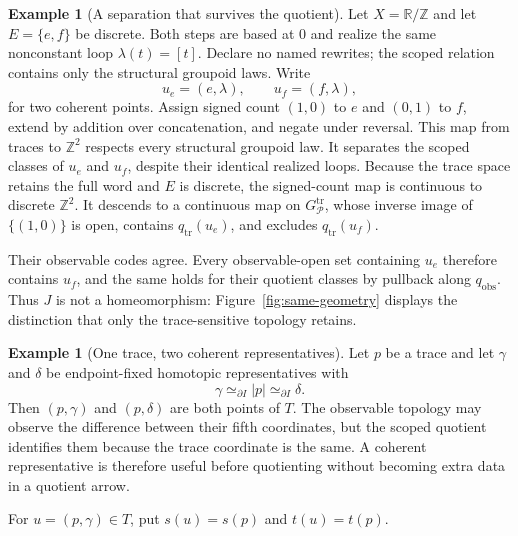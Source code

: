\documentclass[10pt,reqno]{amsart}
\theoremstyle{definition}
\newtheorem{example}[definition]{Example}
\theoremstyle{plain}
\theoremstyle{remark}
\newcommand{\FigureAltText}[1]{\par\smallskip{\small\textbf{Alt text:} #1\par}}
\newcommand{\MainFigure}[2]{%
  \begingroup\let\SavedFigureCaption\caption
  \renewcommand{\caption}[1]{\SavedFigureCaption{##1}\FigureAltText{#2}}%
  \endgroup}
\begin{document}
\begin{example}[A separation that survives the quotient]
\label{ex:quotient-topology-separation}
Let $X=\mathbb R/\mathbb Z$ and let $E=\{e,f\}$ be discrete.
Both steps are based at $0$ and realize the same nonconstant loop
$\lambda(t)=[t]$.  Declare no named rewrites; the scoped relation contains
only the structural groupoid laws.  Write
\[
  u_e=(e,\lambda),\qquad u_f=(f,\lambda),
\]
for two coherent points.  Assign signed count $(1,0)$ to $e$ and $(0,1)$
to $f$, extend by addition over concatenation, and negate under reversal.
This map from traces to $\mathbb Z^2$ respects every structural groupoid
law.  It separates the scoped classes of $u_e$ and $u_f$, despite their
identical realized loops.  Because the trace space retains the full word
and $E$ is discrete, the signed-count map is continuous to discrete
$\mathbb Z^2$.  It descends to a continuous map on
$G_{\mathcal P}^{\mathrm{tr}}$, whose inverse image of $\{(1,0)\}$ is open,
contains $q_{\mathrm{tr}}(u_e)$, and excludes $q_{\mathrm{tr}}(u_f)$.

Their observable codes agree. Every observable-open set containing $u_e$
therefore contains $u_f$, and the same holds for their quotient classes by
pullback along $q_{\mathrm{obs}}$. Thus $J$ is not a homeomorphism:
Figure~\ref{fig:same-geometry} displays the distinction that only the
trace-sensitive topology retains.

\end{example}

\MainFigure{same-geometry}{Two distinct scoped classes have separating neighborhoods in the trace-sensitive quotient but identical neighborhoods in the observable quotient.}



\begin{example}[One trace, two coherent representatives]
Let $p$ be a trace and let $\gamma$ and $\delta$ be endpoint-fixed homotopic
representatives with
\[
  \gamma\simeq_{\partial I}|p|\simeq_{\partial I}\delta.
\]
Then $(p,\gamma)$ and $(p,\delta)$ are both points of $T$.  The observable
topology may observe the difference between their fifth coordinates, but the
scoped quotient identifies them because the trace coordinate is the same.
A coherent representative is therefore useful before quotienting without
becoming extra data in a quotient arrow.
\end{example}

For $u=(p,\gamma)\in T$, put $s(u)=s(p)$ and $t(u)=t(p)$.
\end{document}

